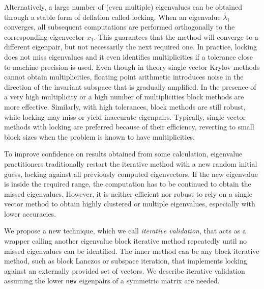 \documentclass{report}
\begin{document}
Alternatively, a large number of (even multiple) eigenvalues can be
obtained through a stable form of deflation called locking.
When an eigenvalue $\lambda_1$ converges, all subsequent
computations are performed orthogonally to the corresponding
eigenvector $x_1$.
This guarantees that the method will converge to a different eigenpair,
but not necessarily the next required one.
In practice, locking does not miss eigenvalues and it even identifies
multiplicities if a tolerance close to machine precision is used.
Even though in theory single vector Krylov methods cannot obtain
multiplicities, floating point arithmetic introduces noise in the direction
of the invariant subspace that is gradually amplified.
In the presence of a very high multiplicity or a high number of multiplicities
block methods are more effective.
Similarly, with high tolerances, block methods are still
robust, while locking may miss or yield inaccurate eigenpairs.
Typically, single vector methods with locking are preferred because of
their efficiency, reverting to small block sizes when the problem is
known to have multiplicities.


To improve confidence on results obtained from some calculation,
eigenvalue practitioners traditionally restart the iterative method
with a new random initial guess, locking against all previously computed
eigenvectors.
If the new eigenvalue is inside the required range, the computation has
to be continued to obtain the missed eigenvalues.
However, it is neither efficient nor robust to rely on a single
vector method to obtain highly clustered or multiple eigenvalues, especially
with lower accuracies.

We propose a new technique, which we call {\it iterative validation},
that acts as a wrapper calling another eigenvalue block iterative method
repeatedly until no missed eigenvalues can be identified.
The inner method can be any block iterative method, such as
block Lanczos or subspace iteration, that implements locking against
an externally provided set of vectors.
We describe iterative validation assuming the lower {\tt nev}
eigenpairs of a symmetric matrix are needed.
\end{document}

